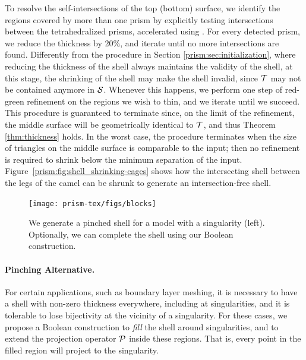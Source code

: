 To resolve the self-intersections of the top (bottom) surface, we identify the regions covered by more than one prism by explicitly testing intersections between the tetrahedralized prisms, accelerated using \cite{zomorodian2000fast}. For every detected prism, we reduce the thickness by 20\%, and iterate until no more intersections are found. 
Differently from the procedure in Section \ref{prism:sec:initialization}, where reducing the thickness of the shell always maintains the validity of the shell, at this stage, the shrinking of the shell may make the shell invalid, since $\T$ may not be contained anymore in $\S$. 
Whenever this happens, we perform one step of red-green refinement \cite{bank1983some} on the regions we wish to thin, and we iterate until we succeed. This procedure is guaranteed to terminate since, on the limit of the refinement, the middle surface will be geometrically identical to $\T$, and thus Theorem \ref{thm:thickness} holds.
In the worst case, the procedure terminates when the size of triangles on the middle surface is comparable to the input; then no refinement is required to shrink below the minimum separation of the input.
Figure~\ref{prism:fig:shell_shrinking-cages} shows how the intersecting shell between the legs of the camel can be shrunk to generate an intersection-free shell. 



\begin{figure}
    \centering
    \texttt{[image: prism-tex/figs/blocks]}
    \caption{We generate a pinched shell for a model with a singularity (left).
    Optionally, we can complete the shell using our Boolean construction.}
    \label{prism:fig:singularity-boolean}
    
\end{figure}


\paragraph{Pinching Alternative.} For certain applications, such as boundary layer meshing, it is necessary to have a shell with non-zero thickness everywhere, including at singularities, and it is tolerable to lose bijectivity at the vicinity of a singularity. For these cases, we propose a Boolean construction to \emph{fill} the shell around singularities, and to extend the projection operator $\P$ inside these regions. That is, every point in the filled region will project to the singularity. 

